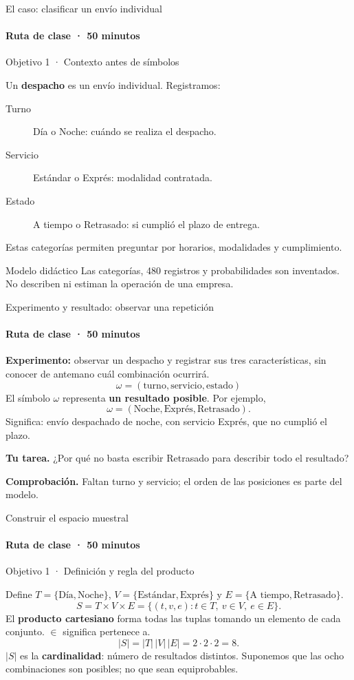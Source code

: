 \documentclass[aspectratio=169,11pt,spanish]{beamer}
\newcommand{\objetivo}[1]{{\small\color{TecAzul}#1\par}\medskip}
\newcommand{\pregunta}[1]{\par\smallskip\textbf{Tu tarea.} #1\par}
\newcommand{\verifica}[1]{\par\smallskip\textbf{Comprobación.} #1\par}
\begin{document}
\begin{frame}{El caso: clasificar un envío individual}
\framesubtitle{Ruta de clase · 50 minutos}
\objetivo{Objetivo 1 · Contexto antes de símbolos}
Un \textbf{despacho} es un envío individual. Registramos:
\begin{description}
\item[Turno] Día o Noche: cuándo se realiza el despacho.
\item[Servicio] Estándar o Exprés: modalidad contratada.
\item[Estado] A tiempo o Retrasado: si cumplió el plazo de entrega.
\end{description}
Estas categorías permiten preguntar por horarios, modalidades y cumplimiento.
\begin{alertblock}{Modelo didáctico}
Las categorías, 480 registros y probabilidades son inventados. No describen ni estiman la operación de una empresa.
\end{alertblock}
\end{frame}

\begin{frame}{Experimento y resultado: observar una repetición}
\framesubtitle{Ruta de clase · 50 minutos}
\textbf{Experimento:} observar un despacho y registrar sus tres características, sin conocer de antemano cuál combinación ocurrirá.
\[
\omega=(\text{turno},\text{servicio},\text{estado})
\]
El símbolo $\omega$ representa \textbf{un resultado posible}. Por ejemplo,
\[
\omega=(\text{Noche},\text{Exprés},\text{Retrasado}).
\]
Significa: envío despachado de noche, con servicio Exprés, que no cumplió el plazo.
\pregunta{¿Por qué no basta escribir Retrasado para describir todo el resultado?}
\verifica{Faltan turno y servicio; el orden de las posiciones es parte del modelo.}
\end{frame}

\begin{frame}{Construir el espacio muestral}
\framesubtitle{Ruta de clase · 50 minutos}
\objetivo{Objetivo 1 · Definición y regla del producto}
Define $T=\{\text{Día},\text{Noche}\}$, $V=\{\text{Estándar},\text{Exprés}\}$ y
$E=\{\text{A tiempo},\text{Retrasado}\}$.
\[
S=T\times V\times E=\{(t,v,e):t\in T,\ v\in V,\ e\in E\}.
\]
El \textbf{producto cartesiano} forma todas las tuplas tomando un elemento de cada conjunto. $\in$ significa pertenece a.
\[
|S|=|T|\,|V|\,|E|=2\cdot2\cdot2=8.
\]
$|S|$ es la \textbf{cardinalidad}: número de resultados distintos. Suponemos que las ocho combinaciones son posibles; no que sean equiprobables.
\end{frame}
\end{document}
